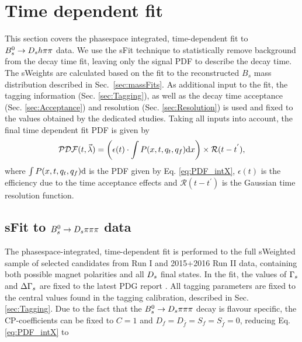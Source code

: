\section{Time dependent fit}
\label{sec:Tfit}

This section covers the phasespace integrated, time-dependent fit to ${{B}^0_{s}}\rightarrow{\ensuremath{{D}_{s}}}{\ensuremath{h}}{\ensuremath{\pi}}{\ensuremath{\pi}}$ data.
We use the \textsf{sFit} technique \cite{Pivk:2004ty}  to statistically remove background from the decay time fit, leaving only the signal PDF to describe the decay time. 
The \textsf{sWeights} are calculated based on the fit to the reconstructed $B_s$ mass distribution described in Sec.~\ref{sec:massFits}.
As additional input to the fit, the tagging information (Sec. \ref{sec:Tagging}), 
as well as the decay time acceptance (Sec. \ref{sec:Acceptance}) and resolution (Sec. \ref{sec:Resolution}) is used and fixed to the values obtained by the dedicated studies. 
Taking all inputs into account, the final time dependent fit PDF is given by
\begin{equation}
\label{eq:TPDF_full}
\mathcal{PDF}(t,\vec{\lambda}) = \left(\epsilon(t)\cdot \int P(x,t,q_t,q_f) \text d x \right) \times \mathcal{R}(t - t^{'}),
\end{equation}
where $\int P(x,t,q_t,q_f) \text d$ is the PDF given by Eq. \ref{eq:PDF_intX}, $\epsilon(t)$ is the efficiency due to the time acceptance effects and $\mathcal{R}(t - t^{'})$ is the Gaussian time resolution function. 



\subsection{sFit to ${{B}^0_{s}}\rightarrow{\ensuremath{{D}_{s}}}{\ensuremath{\pi}}{\ensuremath{\pi}}{\ensuremath{\pi}}$ data}  
The phasespace-integrated, time-dependent fit is performed to the full sWeighted sample of selected candidates from Run I and 2015+2016 Run II data, containing both possible magnet polarities and all ${{D}_{s}}$ final states.
In the fit, the values of ${\Gamma_{{s}}}$ and ${\Delta\Gamma_{{s}}}$ are fixed to the latest PDG report \cite{PDG2016}. All tagging parameters are fixed to the central values found in the tagging calibration, described in Sec. \ref{sec:Tagging}.
Due to the fact that the ${{B}^0_{s}}\rightarrow{\ensuremath{{D}_{s}}}{\ensuremath{\pi}}{\ensuremath{\pi}}{\ensuremath{\pi}}$ decay is flavour specific, the CP-coefficients can be fixed to $C=1$ and $D_{f} = D_{\bar{f}} = S_{f} = S_{\bar{f}} = 0$, reducing Eq. \ref{eq:PDF_intX} to

